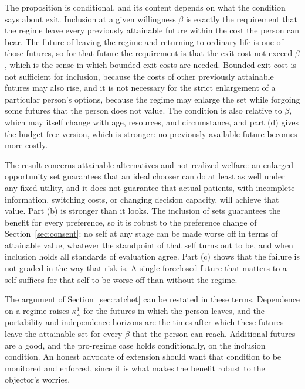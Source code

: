 \documentclass[11pt]{article}
\theoremstyle{plain}
\theoremstyle{definition}
\theoremstyle{remark}
\begin{document}
The proposition is conditional, and its content depends on what the condition says about exit. Inclusion at a given willingness $\beta$ is exactly the requirement that the regime leave every previously attainable future within the cost the person can bear. The future of leaving the regime and returning to ordinary life is one of those futures, so for that future the requirement is that the exit cost not exceed $\beta$, which is the sense in which bounded exit costs are needed. Bounded exit cost is not sufficient for inclusion, because the costs of other previously attainable futures may also rise, and it is not necessary for the strict enlargement of a particular person's options, because the regime may enlarge the set while forgoing some futures that the person does not value. The condition is also relative to $\beta$, which may itself change with age, resources, and circumstance, and part (d) gives the budget-free version, which is stronger: no previously available future becomes more costly.

The result concerns attainable alternatives and not realized welfare: an enlarged opportunity set guarantees that an ideal chooser can do at least as well under any fixed utility, and it does not guarantee that actual patients, with incomplete information, switching costs, or changing decision capacity, will achieve that value. Part (b) is stronger than it looks. The inclusion of sets guarantees the benefit for every preference, so it is robust to the preference change of Section~\ref{sec:consent}: no self at any stage can be made worse off in terms of attainable value, whatever the standpoint of that self turns out to be, and when inclusion holds all standards of evaluation agree. Part (c) shows that the failure is not graded in the way that risk is. A single foreclosed future that matters to a self suffices for that self to be worse off than without the regime.

The argument of Section~\ref{sec:ratchet} can be restated in these terms. Dependence on a regime raises $\kappa^1_\omega$ for the futures in which the person leaves, and the portability and independence horizons are the times after which these futures leave the attainable set for every $\beta$ that the person can reach. Additional futures are a good, and the pro-regime case holds conditionally, on the inclusion condition. An honest advocate of extension should want that condition to be monitored and enforced, since it is what makes the benefit robust to the objector's worries.
\end{document}
